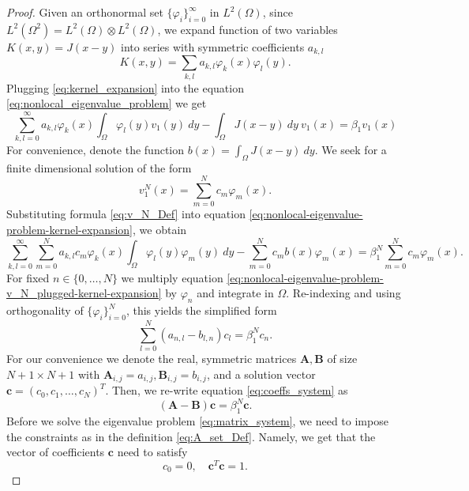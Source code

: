 \documentclass[11pt, a4paper]{article}
\theoremstyle{break}
\theoremstyle{break}
\theoremstyle{break}
\theoremstyle{break}
\theoremstyle{break}
\theoremstyle{break}
\theoremstyle{break}
\theoremstyle{break}
\theoremstyle{break}
\theoremstyle{break}
\begin{document}
\begin{proof}

    Given an orthonormal set $\{\varphi_i\}_{i=0}^\infty$ in $L^2(\Omega)$, since $L^2(\Omega^2) = L^2(\Omega) \otimes L^2(\Omega)$, we expand function of two variables $K(x,y) = J(x-y)$ into series with symmetric coefficients $a_{k,l}$
    \begin{equation}
        \label{eq:kernel_expansion}
        K(x,y) = \sum_{k,l} a_{k, l} \varphi_k(x) \varphi_l(y).
    \end{equation}
    Plugging \eqref{eq:kernel_expansion} into the equation \eqref{eq:nonlocal_eigenvalue_problem} we get
    \begin{equation}
        \label{eq:nonlocal-eigenvalue-problem-kernel-expansion}
        \sum_{k, l = 0}^\infty a_{k, l} \varphi_k(x)\int_\Omega \varphi_l(y) v_1(y)\:dy - \int_\Omega J(x-y)\:dy\: v_1(x) = \beta_1 v_1(x)
    \end{equation}
    For convenience, denote the function $b(x) = \int_\Omega J(x-y)\:dy$. We seek for a finite dimensional solution of the form
    \begin{equation}
        \label{eq:v_N_Def}
        v_1^N(x) = \sum_{m=0}^N c_m \varphi_m(x).
    \end{equation}
    Substituting formula \eqref{eq:v_N_Def} into equation \eqref{eq:nonlocal-eigenvalue-problem-kernel-expansion}, we obtain
    \begin{equation}
        \label{eq:nonlocal-eigenvalue-problem-v_N_plugged-kernel-expansion}
        \sum_{k, l = 0}^\infty \sum_{m=0}^N a_{k, l} c_m \varphi_k(x)\int_\Omega \varphi_l(y) \varphi_m(y)\:dy - \sum_{m=0}^N c_m b(x) \varphi_m(x) = \beta_1^N \sum_{m=0}^N c_m \varphi_m(x).
    \end{equation}
    For fixed $n \in \{0, \ldots, N\}$ we multiply equation \eqref{eq:nonlocal-eigenvalue-problem-v_N_plugged-kernel-expansion} by $\varphi_n$ and integrate in $\Omega$. Re-indexing and using orthogonality of $\{\varphi_i\}_{i=0}^N$, this yields the simplified form
    \begin{equation}
        \label{eq:coeffs_system}
        \sum_{l=0}^N(a_{n, l} - b_{l,n}) c_l = \beta_1^N c_n.
    \end{equation}
    For our convenience we denote the real, symmetric matrices $\mathbf{A}, \mathbf{B}$ of size $N+1 \times N+1$ with $\mathbf{A}_{i,j} = a_{i,j}, \mathbf{B}_{i, j} = b_{i,j}$, and a solution vector $\mathbf{c} = (c_0, c_1, \ldots, c_N)^T$. Then, we re-write equation \eqref{eq:coeffs_system} as
    \begin{equation}
        \label{eq:matrix_system}
        (\mathbf{A} - \mathbf{B}) \mathbf{c} = \beta_1^N \mathbf{c}.
    \end{equation}
    Before we solve the eigenvalue problem \eqref{eq:matrix_system}, we need to impose the constraints as in the definition \eqref{eq:A_set_Def}. Namely, we get that the vector of coefficients $\mathbf{c}$ need to satisfy
    \begin{equation}
        \label{eq:matrix_system_constraint}
        c_0 = 0, \quad \mathbf{c}^T \mathbf{c} = 1.
    \end{equation}
    
\end{proof}
\end{document}
